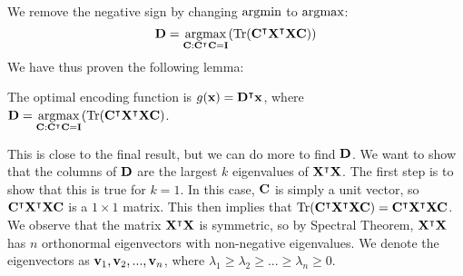 We remove the negative sign by changing $\argmin$ to $\argmax$:
$$\MD = \underset{\MC : \MC^\intercal\MC = \MI}{\argmax} (\trace(\MC^\intercal\MX^\intercal\MX\MC))$$
We have thus proven the following lemma:
\begin{lemma}
    The optimal encoding function is $g(\vx) = \MD^\intercal\vx$, where $\MD = \underset{\MC : \MC^\intercal\MC = \MI}{\argmax} (\trace(\MC^\intercal\MX^\intercal\MX\MC)$.
\end{lemma}
This is close to the final result, but we can do more to find $\MD$.  We want to show that the columns of $\MD$ are the largest $k$ eigenvalues of $\MX^\intercal\MX$.  The first step is to show that this is true for $k = 1$.  In this case, $\MC$ is simply a unit vector, so $\MC^\intercal\MX^\intercal\MX\MC$ is a $1 \times 1$ matrix.  This then implies that $\trace(\MC^\intercal\MX^\intercal\MX\MC) = \MC^\intercal\MX^\intercal\MX\MC$.  We observe that the matrix $\MX^\intercal\MX$ is symmetric, so by Spectral Theorem, $\MX^\intercal\MX$ has $n$ orthonormal eigenvectors with non-negative eigenvalues.  We denote the eigenvectors as $\vv_1, \vv_2, ..., \vv_n$, where $\lambda_1 \geq \lambda_2 \geq ... \geq \lambda_n \geq 0$.

